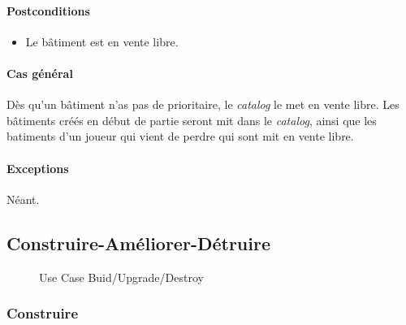 \documentclass[a4paper,11pt]{report}
\begin{document}
\paragraph{Postconditions}
\begin{itemize}
 \item Le bâtiment est en vente libre.
\end{itemize}
\paragraph{Cas général}
Dès qu'un bâtiment n'as pas de prioritaire, le \textit{catalog} le met en vente libre. Les bâtiments créés en début de partie seront mit dans le \textit{catalog}, ainsi que les batiments d'un joueur qui vient de perdre qui sont mit en vente libre.
\paragraph{Exceptions} Néant.

\newpage
\subsection{Construire-Améliorer-Détruire}
\begin{figure}[ht]
    \caption{Use Case Buid/Upgrade/Destroy}
\end{figure}
\subsubsection{Construire}
\end{document}
